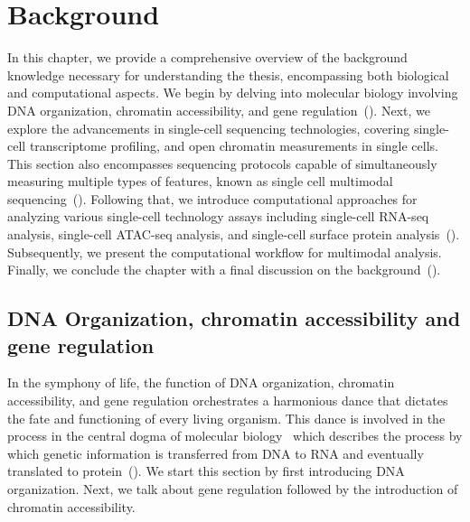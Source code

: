 %
%
\chapter{Background}
\label{cha:background}
\graphicspath{{chapter2/figs/}}

In this chapter, we provide a comprehensive overview of the background knowledge necessary for understanding the thesis, encompassing both biological and computational aspects. We begin by delving into molecular biology involving DNA organization, chromatin accessibility, and gene regulation~(). Next, we explore the advancements in single-cell sequencing technologies, covering single-cell transcriptome profiling, and open chromatin measurements in single cells. This section also encompasses sequencing protocols capable of simultaneously measuring multiple types of features, known as single cell multimodal sequencing~(). Following that, we introduce computational approaches for analyzing various single-cell technology assays including single-cell RNA-seq analysis, single-cell ATAC-seq analysis, and single-cell surface protein analysis~(). Subsequently, we present the computational workflow for multimodal analysis. Finally, we conclude the chapter with a final discussion on the background~().


\section{DNA Organization, chromatin accessibility and gene regulation}
\label{background:DNA_Chromatin_Regulation}
In the symphony of life, the function of DNA organization, chromatin accessibility, and gene regulation orchestrates a harmonious dance that dictates the fate and functioning of every living organism. This dance is involved in the process in the central dogma of molecular biology~\citep{crick1970central} which describes the process by which genetic information is transferred from DNA to RNA and eventually translated to protein~(). We start this section by first introducing DNA organization. Next, we talk about gene regulation followed by the introduction of chromatin accessibility.

